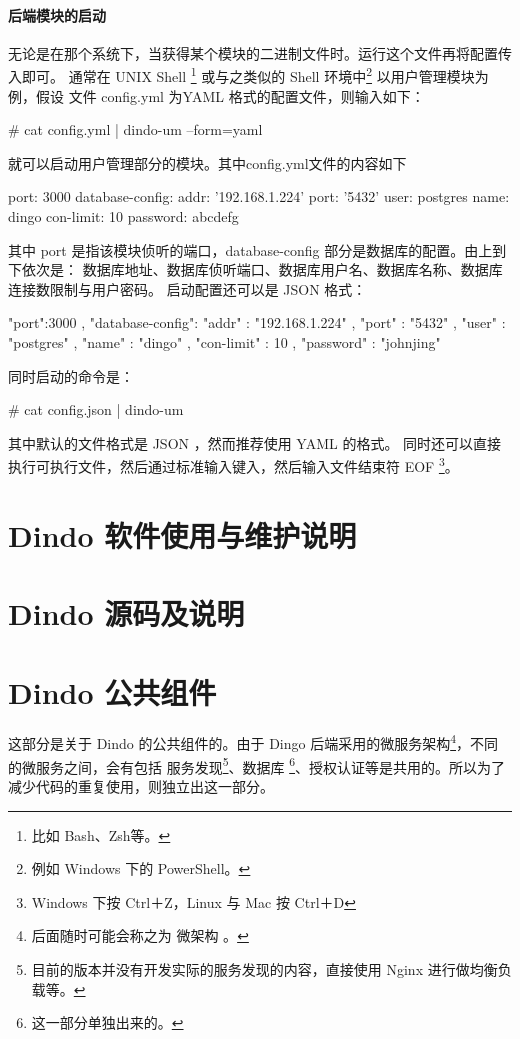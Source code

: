 \documentclass{dingo}
\begin{document}
					\paragraph{后端模块的启动}
						无论是在那个系统下，当获得某个模块的二进制文件时。运行这个文件再将配置传入即可。
						通常在 UNIX Shell \footnote{比如 Bash、Zsh等。} 或与之类似的 Shell 环境中\footnote{例如 Windows 下的 PowerShell。}
						以用户管理模块为例，假设 文件 config.yml 为YAML 格式的配置文件，则输入如下：
						\begin{shell}
	# cat config.yml | dindo-um --form=yaml
						\end{shell}
						就可以启动用户管理部分的模块。其中config.yml文件的内容如下
						\begin{yaml}
	port: 3000
	database-config:
	  addr: '192.168.1.224'
	  port: '5432'
	  user: postgres
	  name: dingo
	  con-limit: 10
	  password: abcdefg
						\end{yaml}
						其中 port 是指该模块侦听的端口，database-config 部分是数据库的配置。由上到下依次是：
						数据库地址、数据库侦听端口、数据库用户名、数据库名称、数据库连接数限制与用户密码。
						启动配置还可以是 JSON 格式：
						\begin{json}
	{ "port":3000
	, "database-config":
	  { "addr" : "192.168.1.224"
	  , "port" : "5432"
	  , "user" : "postgres"
	  , "name" : "dingo"
	  , "con-limit" : 10
	  , "password" : "johnjing"
	  }
	}
						\end{json}
						同时启动的命令是：
						\begin{code}
	# cat config.json | dindo-um
						\end{code}
						其中默认的文件格式是 JSON ，然而推荐使用 YAML 的格式。
						同时还可以直接执行可执行文件，然后通过标准输入键入，然后输入文件结束符 EOF
						\footnote{Windows 下按 Ctrl＋Z，Linux 与 Mac 按 Ctrl＋D}。

  	\section{Dindo 软件使用与维护说明}

    \section{Dindo 源码及说明}

    \section{Dindo 公共组件}
    这部分是关于 Dindo 的公共组件的。由于 Dingo 后端采用的微服务架构\footnote{后面随时可能会称之为 微架构 。}，不同的微服务之间，会有包括
    服务发现\footnote{目前的版本并没有开发实际的服务发现的内容，直接使用 Nginx 进行做均衡负载等。}、数据库
  \footnote{这一部分单独出来的。}、授权认证等是共用的。所以为了减少代码的重复使用，则独立出这一部分。
\end{document}
